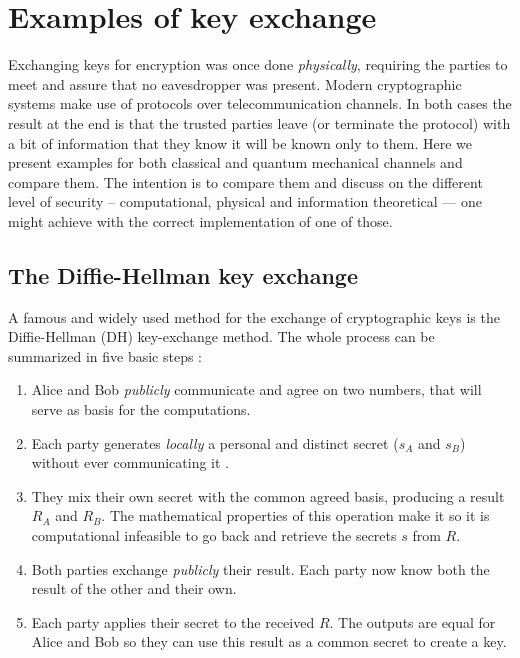 \section{Examples of key exchange}
	Exchanging keys for encryption was once done \textit{physically}, requiring the parties to meet and assure that no eavesdropper was present.
	Modern cryptographic systems make use of protocols over telecommunication channels. 
	In both cases the result at the end is that the trusted parties leave (or terminate the protocol) with a bit of information that they know it will be known only to them.
	Here we present examples for both classical and quantum mechanical channels and compare them.
	The intention is to compare them and discuss on the different level of security -- computational, physical and information theoretical --- one might achieve with the correct implementation of one of those.
		\subsection{The Diffie-Hellman key exchange}
		\label{Diffie}
	
		A famous and widely used method for the exchange of cryptographic keys is the Diffie-Hellman (DH) key-exchange method.
	The whole process can be summarized in five basic steps \cite{DH76}:
	\begin{enumerate}
		\item Alice and Bob \emph{publicly} communicate and agree on two numbers, that will serve as basis for the computations.
		\item Each party generates \emph{locally} a personal and distinct secret ($s_A$ and $s_B$) without ever communicating it .
		\item They mix their own secret with the common agreed basis, producing a result $R_A$ and $R_B$. The mathematical properties of this operation make it so it is computational infeasible to go back and retrieve the secrets $s$ from $R$.
		\item Both parties exchange \emph{publicly} their result. Each party now know both the result of the other and their own.
		\item Each party applies their secret to the received $R$. The outputs are equal for Alice and Bob so they can use this result as a common secret to create a key.
	\end{enumerate}	 
	
